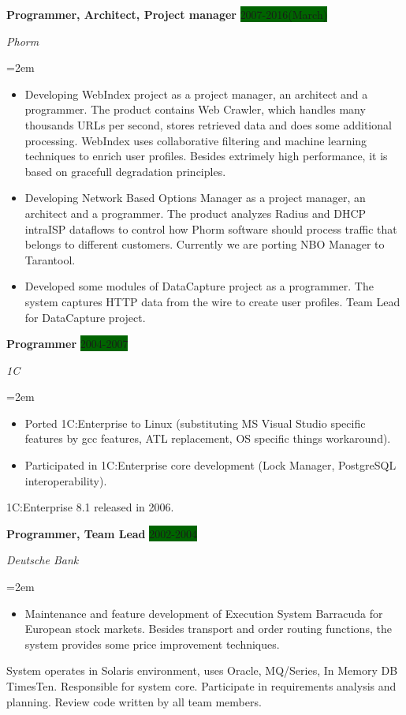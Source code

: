 \documentclass[paper=a4,fontsize=11pt]{scrartcl} %
\newcommand{\sepspace}{\vspace*{1em}}       %
\newcommand{\EducationEntry}[4]{\pagebreak[2]
        \noindent \textbf{#1} \hfill      %
        \colorbox{DarkGreen}{%
            \hfill\color{White}#2} \par  %
        \noindent \textit{#3} \par        %
        \noindent\hangindent=2em\hangafter=0 \small #4 %
        \normalsize \par}
\newcommand{\WorkEntry}[4]{\pagebreak[2]    %
        \noindent \textbf{#1} \hfill      %
        \colorbox{DarkGreen}{\color{White}#2} \par  %
        \noindent \textit{#3} \par        %
        \noindent\hangindent=2em\hangafter=0 \small #4 %
        \normalsize \par         \sepspace}
\begin{document}
\WorkEntry{Programmer, Architect, Project manager}{2007-2016(March)}{Phorm}{
\begin{itemize}  \itemsep0em
\item  Developing WebIndex project as a project manager, an architect and a programmer. The product contains Web Crawler, which handles many thousands URLs per second, stores retrieved data and does some additional processing. WebIndex uses collaborative filtering and machine learning techniques to enrich user profiles. Besides extrimely high performance, it is based on gracefull degradation principles.
\item Developing Network Based Options Manager as a project manager, an architect and a programmer. The product analyzes Radius and DHCP intraISP dataflows to control how Phorm software should process traffic that belongs to different customers. Currently we are porting NBO Manager to Tarantool. 
\item Developed some modules of DataCapture project as a programmer. The system captures HTTP data from the wire to create user profiles. Team Lead for DataCapture project.
\end{itemize}
}
\sepspace

\WorkEntry{Programmer}{2004-2007}{1C}{
\begin{itemize}\itemsep0em
\item Ported 1C:Enterprise to Linux (substituting MS Visual Studio specific features by gcc features, ATL replacement, OS specific things workaround).
\item Participated in 1C:Enterprise core development (Lock Manager, PostgreSQL interoperability).
\end{itemize}
1C:Enterprise 8.1 released in 2006.
}

\WorkEntry{Programmer, Team Lead}{2002-2004}{Deutsche Bank}{
\begin{itemize}\itemsep0em
\item  Maintenance and feature development of Execution System Barracuda for European stock markets. Besides transport and order routing functions, the system provides some price improvement techniques.
\end{itemize}
System operates in Solaris environment, uses Oracle, MQ/Series, In Memory DB TimesTen.
Responsible for system core.
Participate in requirements analysis and planning. 
Review code written by all team members.
}
\end{document}
